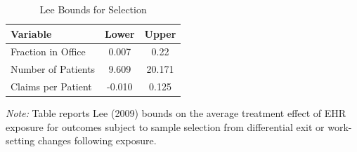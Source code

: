 \begin{table}[ht!]
\centering
\caption{\label{leebouns}Lee Bounds for Selection}
\begin{threeparttable}
\begin{tabular}[t]{lcc}
\toprule
Variable & Lower & Upper\\
\midrule
Fraction in Office & 0.007 & 0.22\\
Number of Patients & 9.609 & 20.171\\
Claims per Patient & -0.010 & 0.125\\
\bottomrule
\end{tabular}
\begin{tablenotes}
\item \textit{Note: } Table reports Lee (2009) bounds on the average treatment effect of EHR exposure for outcomes subject to sample selection from differential exit or work-setting changes following exposure. 
\end{tablenotes}
\end{threeparttable}
\end{table}